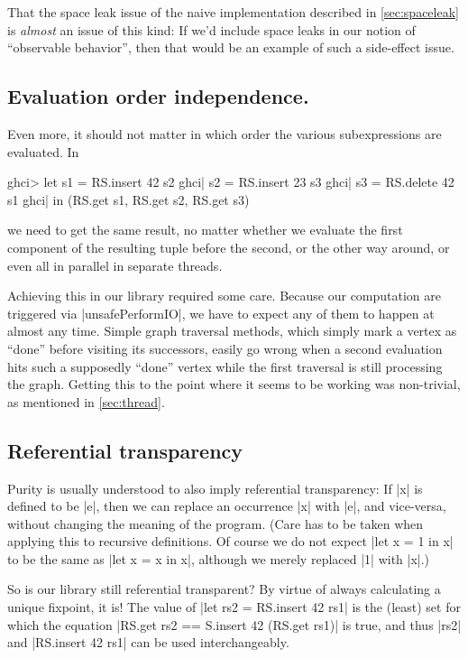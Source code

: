 \documentclass[manuscript,anonymous,screen,acmsmall]{acmart}
\begin{document}
That the space leak issue of the naive implementation described in \cref{sec:spaceleak} is \emph{almost} an issue of this kind: If we’d include space leaks in our notion of “observable behavior”, then that would be an example of such a side-effect issue.

\subsection{Evaluation order independence.}

Even more, it should not matter in which order the various subexpressions are evaluated. In
\begin{code}
ghci> let  s1 = RS.insert 42 s2
ghci|      s2 = RS.insert 23 s3
ghci|      s3 = RS.delete 42 s1
ghci| in (RS.get s1, RS.get s2, RS.get s3)
\end{code}
we need to get the same result, no matter whether we evaluate the first component of the resulting tuple before the second, or the other way around, or even all in parallel in separate threads.

Achieving this in our library required some care. Because our computation are triggered via |unsafePerformIO|, we have to expect any of them to happen at almost any time. Simple graph traversal methods, which simply mark a vertex as “done” before visiting its successors, easily go wrong when a second evaluation hits such a supposedly “done” vertex while the first traversal is still processing the graph. Getting this to the point where it seems to be working was non-trivial, as mentioned in \cref{sec:thread}.

\subsection{Referential transparency}\label{sec:reftrans}

Purity is usually understood to also imply referential transparency: If |x| is defined to be |e|, then we can replace an occurrence |x| with |e|, and vice-versa, without changing the meaning of the program.
(Care has to be taken when applying this to recursive definitions. Of course we do not expect |let x = 1 in x| to be the same as |let x = x in x|, although we merely replaced |1| with |x|.)

So is our library still referential transparent? By virtue of always calculating a unique fixpoint, it is!  The value of |let rs2 = RS.insert 42 rs1| is the (least) set for which the equation |RS.get rs2 == S.insert 42 (RS.get rs1)| is true, and thus |rs2| and |RS.insert 42 rs1| can be used interchangeably.
\end{document}

